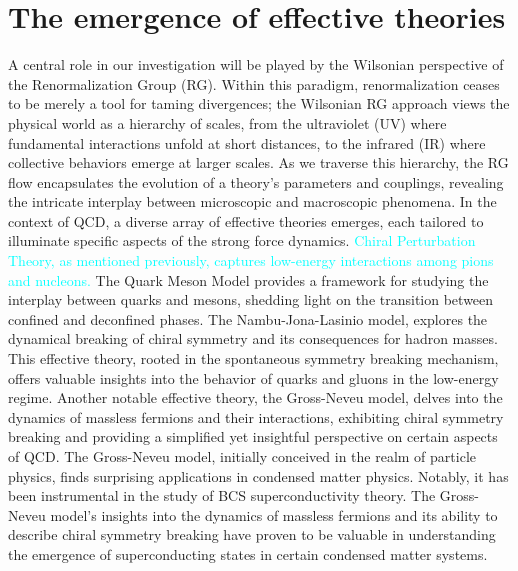 \section{The emergence of effective theories}
A central role in our investigation will be played by the Wilsonian perspective of the Renormalization Group (RG). Within this paradigm, renormalization ceases to be merely a tool for taming divergences; the Wilsonian RG approach views the physical world as a hierarchy of scales, from the ultraviolet (UV) where fundamental interactions unfold at short distances, to the infrared (IR) where collective behaviors emerge at larger scales. As we traverse this hierarchy, the RG flow encapsulates the evolution of a theory's parameters and couplings, revealing the intricate interplay between microscopic and macroscopic phenomena.
In the context of QCD, a diverse array of effective theories emerges, each tailored to illuminate specific aspects of the strong force dynamics. 
\textcolor{cyan}{Chiral Perturbation Theory, as mentioned previously, captures low-energy interactions among pions and nucleons.} The Quark Meson Model provides a framework for studying the interplay between quarks and mesons, shedding light on the transition between confined and deconfined phases.
The Nambu-Jona-Lasinio model, explores the dynamical breaking of chiral symmetry and its consequences for hadron masses. This effective theory, rooted in the spontaneous symmetry breaking mechanism, offers valuable insights into the behavior of quarks and gluons in the low-energy regime.
Another notable effective theory, the Gross-Neveu model, delves into the dynamics of massless fermions and their interactions, exhibiting chiral symmetry breaking and providing a simplified yet insightful perspective on certain aspects of QCD.
The Gross-Neveu model, initially conceived in the realm of particle physics, finds surprising applications in condensed matter physics. Notably, it has been instrumental in the study of BCS superconductivity theory. The Gross-Neveu model's insights into the dynamics of massless fermions and its ability to describe chiral symmetry breaking have proven to be valuable in understanding the emergence of superconducting states in certain condensed matter systems. 

